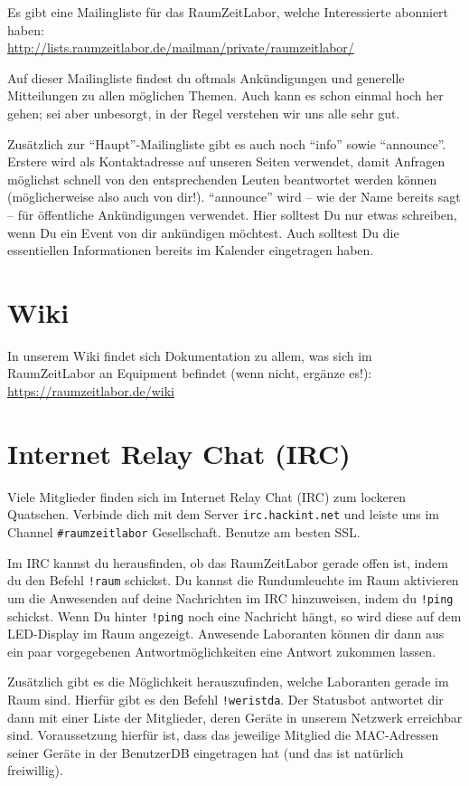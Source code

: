 \documentclass[12pt, DIV16, a4paper]{scrartcl}
\begin{document}
Es gibt eine Mailingliste für das RaumZeitLabor, welche Interessierte abonniert
haben:\\
\url{http://lists.raumzeitlabor.de/mailman/private/raumzeitlabor/}
\np

Auf dieser Mailingliste findest du oftmals Ankündigungen und generelle
Mitteilungen zu allen möglichen Themen. Auch kann es schon einmal hoch her
gehen; sei aber unbesorgt, in der Regel verstehen wir uns alle sehr gut.
\np

Zusätzlich zur ``Haupt''-Mailingliste gibt es auch noch ``info'' sowie
``announce''. Erstere wird als Kontaktadresse auf unseren Seiten verwendet,
damit Anfragen möglichst schnell von den entsprechenden Leuten beantwortet
werden können (möglicherweise also auch von dir!). ``announce'' wird -- wie der
Name bereits sagt -- für öffentliche Ankündigungen verwendet. Hier solltest Du
nur etwas schreiben, wenn Du ein Event von dir ankündigen möchtest. Auch
solltest Du die essentiellen Informationen bereits im Kalender eingetragen
haben.

\section*{Wiki}

In unserem Wiki findet sich Dokumentation zu allem, was sich im RaumZeitLabor
an Equipment befindet (wenn nicht, ergänze es!):
\url{https://raumzeitlabor.de/wiki}

\section*{Internet Relay Chat (IRC)}

Viele Mitglieder finden sich im Internet Relay Chat (IRC) zum lockeren
Quatschen. Verbinde dich mit dem Server \texttt{irc.hackint.net} und leiste uns
im Channel \texttt{\#raumzeitlabor} Gesellschaft. Benutze am besten SSL.
\np

Im IRC kannst du herausfinden, ob das RaumZeitLabor gerade offen ist, indem du
den Befehl \texttt{!raum} schickst. Du kannst die Rundumleuchte im Raum
aktivieren um die Anwesenden auf deine Nachrichten im IRC hinzuweisen, indem du
\texttt{!ping} schickst. Wenn Du hinter \texttt{!ping} noch eine Nachricht
hängt, so wird diese auf dem LED-Display im Raum angezeigt. Anwesende
Laboranten können dir dann aus ein paar vorgegebenen Antwortmöglichkeiten eine
Antwort zukommen lassen.
\np

Zusätzlich gibt es die Möglichkeit herauszufinden, welche Laboranten gerade im
Raum sind. Hierfür gibt es den Befehl \texttt{!weristda}. Der Statusbot
antwortet dir dann mit einer Liste der Mitglieder, deren Geräte in unserem
Netzwerk erreichbar sind. Voraussetzung hierfür ist, dass das jeweilige
Mitglied die MAC-Adressen seiner Geräte in der BenutzerDB eingetragen hat (und
das ist natürlich freiwillig).
\end{document}
